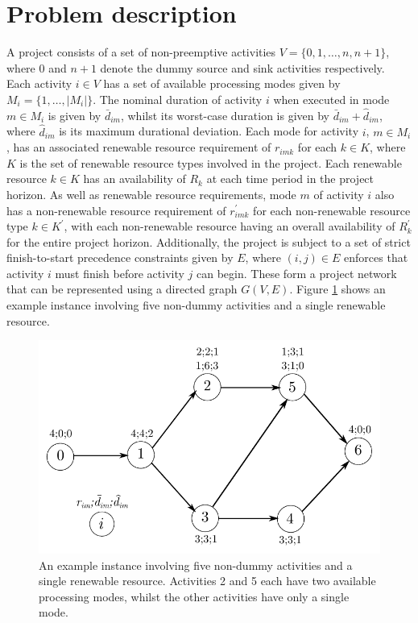 \documentclass[a4paper,abstracton]{scrartcl}
\begin{document}
\section{Problem description}\label{section:problem_description}

A project consists of a set of non-preemptive activities $V=\{0,1,\dots,n,n+1\}$, where 0 and $n+1$ denote the dummy source and sink activities respectively. Each activity $i\in V$ has a set of available processing modes given by $M_i=\{1,\dots,|M_i|\}$. The nominal duration of activity $i$ when executed in mode $m\in M_i$ is given by $\bar{d}_{im}$, whilst its worst-case duration is given by $\bar{d}_{im}+\hat{d}_{im}$, where $\hat{d}_{im}$ is its maximum durational deviation. Each mode for activity $i$, $m\in M_i$, has an associated renewable resource requirement of $r_{imk}$ for each $k\in K$, where $K$ is the set of renewable resource types involved in the project. Each renewable resource $k\in K$ has an availability of $R_{k}$ at each time period in the project horizon. As well as renewable resource requirements, mode $m$ of activity $i$ also has a non-renewable resource requirement of $r^{'}_{imk}$ for each non-renewable resource type $k\in K^{'}$, with each non-renewable resource having an overall availability of $R^{'}_k$ for the entire project horizon. Additionally, the project is subject to a set of strict finish-to-start precedence constraints given by $E$, where $(i,j)\in E$ enforces that activity $i$ must finish before activity $j$ can begin. These form a project network that can be represented using a directed graph $G(V,E)$. Figure \ref{fig:mrcpsp_network} shows an example instance involving five non-dummy activities and a single renewable resource.

\begin{figure}[h]
	\centering
	\includegraphics[scale=0.9]{mrcpsp_network.pdf}
	\caption{An example instance involving five non-dummy activities and a single renewable resource. Activities 2 and 5 each have two available processing modes, whilst the other activities have only a single mode.}
	\label{fig:mrcpsp_network}
\end{figure}
\end{document}
